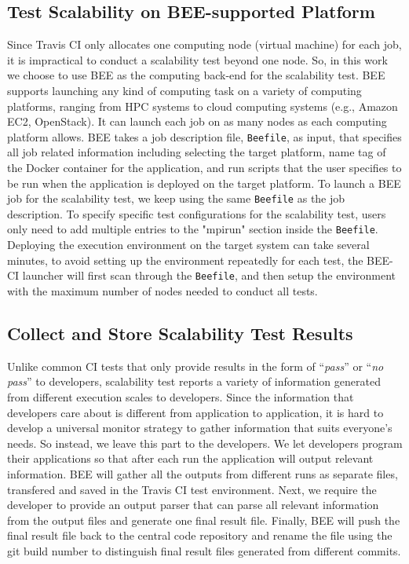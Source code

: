 \subsection{Test Scalability  on BEE-supported Platform}
Since Travis CI only allocates one computing node (virtual machine) for each job, it is impractical to conduct a scalability test beyond one node. So, in this work we choose to use BEE as the computing back-end for the scalability test. BEE supports launching any kind of computing task on a variety of computing platforms, ranging from HPC systems to cloud computing systems (e.g., Amazon EC2, OpenStack). It can launch each job on as many nodes as each computing platform allows. BEE takes a job description file, \texttt{Beefile}, as input, that specifies all job related information including selecting the target platform, name tag of the Docker container for the application, and run scripts that the user specifies to be run when the application is deployed on the target platform. To launch a BEE job for the scalability test, we keep using the same \texttt{Beefile} as the job description. To specify specific test configurations for the scalability test, users only need to add multiple entries to the "mpirun" section inside the \texttt{Beefile}. Deploying the execution environment on the target system can take several minutes, to avoid setting up the environment repeatedly for each test, the BEE-CI launcher will first scan through the \texttt{Beefile}, and then setup the environment with the maximum number of nodes needed to conduct all tests. 

\subsection{Collect and Store Scalability Test Results}
Unlike common CI tests that only provide results in the form of ``\textit{pass}'' or ``\textit{no pass}'' to developers, scalability test reports a variety of information generated from different execution scales to developers. Since the information that developers care about is different from application to application, it is hard to develop a universal monitor strategy to gather information that suits everyone's needs. So instead, we leave this part to the developers. We let developers program their applications so that after each run the application will output relevant information. BEE will gather all the outputs from different runs as separate files, transfered and saved in the Travis CI test environment. Next, we require the developer to provide an output parser that can parse all relevant information from the output files and generate one final result file. Finally, BEE will push the final result file back to the central code repository and rename the file using the git build number to distinguish final result files generated from different commits. %